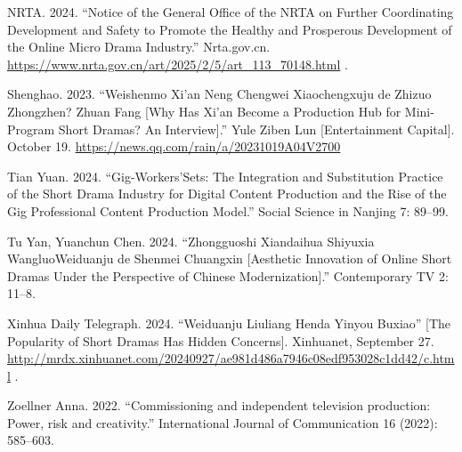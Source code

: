 \documentclass[10pt,a4paper]{article}
\begin{document}
\noindent\begin{minipage}{\linewidth}NRTA. 2024. “Notice of the General Office of the NRTA on Further Coordinating Development and Safety to Promote the Healthy and Prosperous Development of the Online Micro Drama Industry.” Nrta.gov.cn. \url{https://www.nrta.gov.cn/art/2025/2/5/art_113_70148.html} .\par\end{minipage}\par
\noindent\begin{minipage}{\linewidth}Shenghao. 2023. “Weishenmo Xi’an Neng Chengwei Xiaochengxuju de Zhizuo Zhongzhen? Zhuan Fang [Why Has Xi’an Become a Production Hub for Mini-Program Short Dramas? An Interview].” Yule Ziben Lun [Entertainment Capital]. October 19. \url{https://news.qq.com/rain/a/20231019A04V2700}\par\end{minipage}\par
\noindent\begin{minipage}{\linewidth}Tian Yuan. 2024. “Gig-Workers’Sets: The Integration and Substitution Practice of the Short Drama Industry for Digital Content Production and the Rise of the Gig Professional Content Production Model.” Social Science in Nanjing 7: 89–99.\par\end{minipage}\par
\noindent\begin{minipage}{\linewidth}Tu Yan, Yuanchun Chen. 2024. “Zhongguoshi Xiandaihua Shiyuxia WangluoWeiduanju de Shenmei Chuangxin [Aesthetic Innovation of Online Short Dramas Under the Perspective of Chinese Modernization].” Contemporary TV 2: 11–8.\par\end{minipage}\par
\noindent\begin{minipage}{\linewidth}Xinhua Daily Telegraph. 2024. “Weiduanju Liuliang Henda Yinyou Buxiao” [The Popularity of Short Dramas Has Hidden Concerns]. Xinhuanet, September 27. \url{http://mrdx.xinhuanet.com/20240927/ae981d486a7946c08edf953028c1dd42/c.html} .\par\end{minipage}\par
\noindent\begin{minipage}{\linewidth}Zoellner Anna. 2022. “Commissioning and independent television production: Power, risk and creativity.” International Journal of Communication 16 (2022): 585–603.\par\end{minipage}\par
\end{document}
